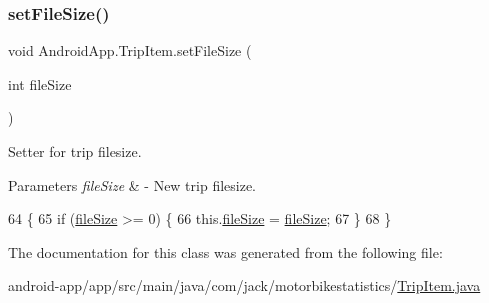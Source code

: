 \subsubsection{\texorpdfstring{set\+File\+Size()}{setFileSize()}}
{\footnotesize\ttfamily void Android\+App.\+Trip\+Item.\+set\+File\+Size (\begin{DoxyParamCaption}\item[{int}]{file\+Size }\end{DoxyParamCaption})\hspace{0.3cm}{\ttfamily [inline]}}



Setter for trip filesize. 


\begin{DoxyParams}{Parameters}
{\em file\+Size} & -\/ New trip filesize. \\
\hline
\end{DoxyParams}

\begin{DoxyCode}
64                                           \{
65         \textcolor{keywordflow}{if} (\hyperlink{class_android_app_1_1_trip_item_a0689a1340427784d8658cc616da310f2}{fileSize} >= 0) \{
66             this.\hyperlink{class_android_app_1_1_trip_item_a0689a1340427784d8658cc616da310f2}{fileSize} = \hyperlink{class_android_app_1_1_trip_item_a0689a1340427784d8658cc616da310f2}{fileSize};
67         \}
68     \}
\end{DoxyCode}


The documentation for this class was generated from the following file\+:\begin{DoxyCompactItemize}
\item 
android-\/app/app/src/main/java/com/jack/motorbikestatistics/\hyperlink{_trip_item_8java}{Trip\+Item.\+java}\end{DoxyCompactItemize}
